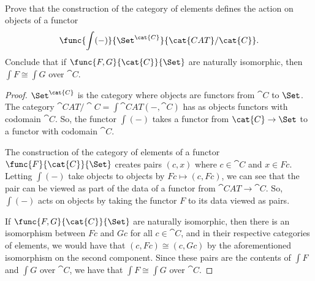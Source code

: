 \documentclass[../../main]{subfiles}
\begin{document}
\paragraph{}
\begin{exercise}
	Prove that the construction of the category of elements defines the action on objects of a functor
	$$
	\func{\int(-)}{\Set^{\cat{C}}}{\cat{CAT}/\cat{C}}.
	$$
	Conclude that if $\func{F,G}{\cat{C}}{\Set}$ are naturally isomorphic, then $\int F \cong \int G$ over $\cat{C}$.
\end{exercise}
\begin{proof}
	$\Set^\cat{C}$ is the category where objects are functors from
	$\cat{C}$ to $\Set$. The category $\cat{CAT}/\cat{C} =
	\int\cat{CAT}(-,\cat{C})$ has as objects functors with codomain
	$\cat{C}$. So, the functor $\int(-)$ takes a functor from
	$\cat{C}\rightarrow\Set$ to a functor with codomain $\cat{C}$.
	
	The construction of the category of elements of a functor
	$\func{F}{\cat{C}}{\Set}$ creates pairs $(c,x)$ where $c\in\cat{C}$ and
	$x\in Fc$. Letting $\int(-)$ take objects to objects by
	$Fc\mapsto(c,Fc)$, we can see that the pair can be viewed as part of
	the data of a functor from $\cat{CAT}\rightarrow\cat{C}$. So, $\int(-)$
	acts on objects by taking the functor $F$ to its data viewed as pairs.
	
	If $\func{F,G}{\cat{C}}{\Set}$ are naturally isomorphic, then there is
	an isomorphism between $Fc$ and $Gc$ for all $c\in\cat{C}$, and in
	their respective categories of elements, we would have that
	$(c,Fc)\cong(c,Gc)$ by the aforementioned isomorphism on the second
	component. Since these pairs are  the contents of $\int F$ and $\int G$
	over $\cat{C}$, we have that $\int F\cong \int G$ over $\cat{C}$.
	
\end{proof}
\end{document}
